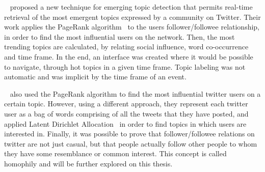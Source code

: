 ~\citet{Cataldi2010} proposed a new technique for emerging topic detection that permits real-time retrieval of the most emergent topics expressed by a community on Twitter. Their work applies the PageRank algorithm~\cite{Pagerank1998} to the users follower/followee relationship, in order to find the most influential users on the network. Then, the most trending topics are calculated, by relating social influence, word co-occurrence and time frame. In the end, an interface was created where it would be possible to navigate, through hot topics in a given time frame. Topic labeling was not automatic and was implicit by the time frame of an event.

~\citet{Weng2010} also used the PageRank algorithm to find the most influential twitter users on a certain topic. However, using a different approach, they represent each twitter user as a bag of words comprising of all the tweets that they have posted, and applied Latent Dirichlet Allocation~\cite{Blei2003} in order to find topics in which users are interested in. Finally, it was possible to prove that follower/followee relations on twitter are not just casual, but that people actually follow other people to whom they have some resemblance or common interest. This concept is called homophily and will be further explored on this thesis.
 
